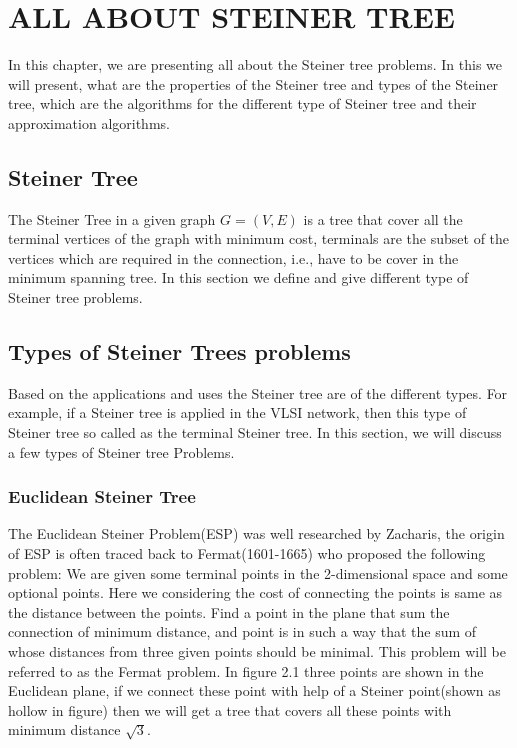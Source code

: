 \chapter{ALL ABOUT STEINER TREE} \label{ch_prelim}
In this chapter, we are presenting all about the Steiner tree problems. In this we will present, what are the properties of the Steiner tree and types of the Steiner tree, which are the algorithms for the different type of Steiner tree and their approximation algorithms.
\section{Steiner Tree}
 The Steiner Tree in a given graph $G = (V,E)$ is a tree that cover all the terminal vertices of the graph with minimum cost, terminals are the subset of the vertices which are required in the connection, i.e., have to be cover in the minimum spanning tree.
 In this section we define and give different type of Steiner tree problems.
\section{Types of Steiner Trees problems}
 Based on the applications and uses the Steiner tree are of the different types. For example, if a Steiner tree is applied in the VLSI network, then this type of Steiner tree so called as the terminal Steiner tree. In this section, we will discuss a few types of Steiner tree Problems.

\subsection{Euclidean Steiner Tree}
 The Euclidean Steiner Problem(ESP) was well researched by Zacharis, the origin of ESP is often traced back to Fermat(1601-1665) 
 who proposed the following problem: We are given some terminal points in the 2-dimensional space and some optional points. Here we considering the cost of connecting the points is same as the distance between the points. Find a point in the plane that sum the connection of minimum distance, and point is in such a way that the sum of whose distances from three given points should be minimal.
  This problem will be referred to as the Fermat problem. In figure 2.1 three points are shown in the Euclidean plane, if we connect these point with help of a Steiner point(shown as hollow in figure) then we will get a tree that covers all these points with minimum distance $\sqrt{3}$. 

